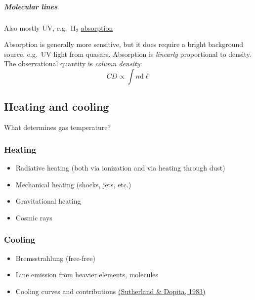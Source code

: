 \documentclass{article}
\begin{document}
\subparagraph{Molecular lines}
Also mostly UV, e.g.\ H$_{2}$
\href{http://astronomy.nmsu.edu/holtz/a555/resources/uvabsorp.htm}
{absorption}

Absorption is generally more sensitive, but it does require a bright
background source, e.g.\ UV light from quasars. Absorption is
\emph{linearly} proportional to density. The observational quantity is
\textit{column density}:
\[
    CD \propto \int{n\mathrm{d}\ell}
    \]

\subsection{Heating and cooling}
What determines gas temperature?
\subsubsection{Heating}
\begin{itemize}
    \item Radiative heating (both via ionization and via heating through dust)
    \item Mechanical heating (shocks, jets, etc.)
    \item Gravitational heating
    \item Cosmic rays
\end{itemize}
\subsubsection{Cooling}
\begin{itemize}
    \item Bremsstrahlung (free-free)
    \item Line emission from heavier elements, molecules
    \item Cooling curves and contributions
        \href{http://adsabs.harvard.edu/abs/1993ApJS...88..253S}
        {(Sutherland \& Dopita, 1983)}
\end{itemize}
\end{document}
